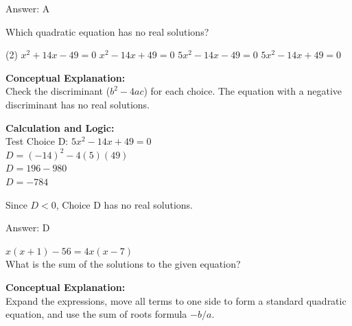 \documentclass[11pt,paper=a4,answers]{exam}
\begin{document}
\begin{questions}
\begin{solution}
\vspace{25pt}

Answer: \colorbox{yellow!100}{A}
\end{solution}

\vspace{40pt}

\question
Which quadratic equation has no real solutions?
\begin{tasks}(2)
    \task $x^2 + 14x - 49 = 0$
    \task $x^2 - 14x + 49 = 0$
    \task $5x^2 - 14x - 49 = 0$
    \task $5x^2 - 14x + 49 = 0$
\end{tasks}

\begin{solution}
\textbf{Conceptual Explanation:} \\
Check the discriminant ($b^2 - 4ac$) for each choice. The equation with a negative discriminant has no real solutions.

\vspace{20pt}

\textbf{Calculation and Logic:} \\
Test Choice D: $5x^2 - 14x + 49 = 0$ \\
$D = (-14)^2 - 4(5)(49)$ \\
$D = 196 - 980$ \\
$D = -784$

\vspace{10pt}

Since $D < 0$, Choice D has no real solutions.

\vspace{25pt}

Answer: \colorbox{yellow!100}{D}
\end{solution}

\vspace{40pt}

\question
$x(x + 1) - 56 = 4x(x - 7)$ \\
What is the sum of the solutions to the given equation?

\begin{solution}
\textbf{Conceptual Explanation:} \\
Expand the expressions, move all terms to one side to form a standard quadratic equation, and use the sum of roots formula $-b/a$.

\vspace{20pt}


\end{solution}
\end{questions}
\end{document}
